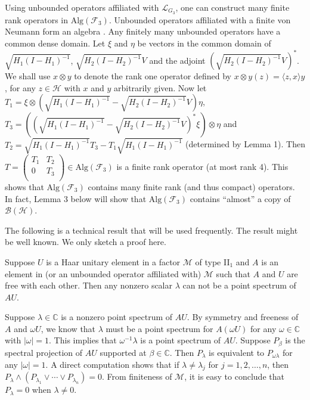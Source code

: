 \documentclass{pnastwo}
\newenvironment{proof}[1][Proof]{\begin{trivlist}
\item[\hskip \labelsep {\bfseries #1}]}{\end{trivlist}}
\newcommand{\B}{\mathcal B}
\newcommand{\F}{\mathcal F}
\newcommand{\HHH}{\mathcal H} %
\newcommand{\LLL}{\mathcal L} %
\newcommand{\M}{\mathcal M}
\newcommand{\Alg}{\mathrm{Alg}}
\newcommand{\C}{\mathbb C} %
\begin{document}
\begin{article}
Using unbounded operators affiliated with $\LLL_{G_3}$, one can
construct many finite rank operators in $\Alg(\F_3)$. Unbounded
operators affiliated with a finite von Neumann form an algebra
\cite{KR}. Any finitely many unbounded operators have a common dense domain.
Let $\xi$ and $\eta$ be vectors in the common domain of
$\sqrt{H_1(I-H_1)^{-1}}$, $\sqrt{H_2(I-H_2)^{-1}}V$ and the
adjoint $(\sqrt{H_2(I-H_2)^{-1}}V)^*$. We shall use $x\otimes y$
to denote the rank one operator defined by $x\otimes
y(z)= \langle z,x  \rangle y$, for any $z\in\HHH$ with $x$ and $y$ arbitrarily
given. Now let $T_1=\xi\otimes (\sqrt{H_1(I-H_1)^{-1}}
-\sqrt{H_2(I-H_2)^{-1}}V)\eta$, $T_3=((\sqrt{H_1(I-H_1)^{-1}}
-\sqrt{H_2(I-H_2)^{-1}}V)^*\xi)\otimes\eta$ and $T_2=
\sqrt{H_1(I-H_1)^{-1}}T_3 -T_1\sqrt{H_1(I-H_1)^{-1}}$ (determined
by Lemma 1). Then $T=\left(
         \begin{array}{cc}
           T_{1} & T_{2} \\
           0 & T_{3} \\
         \end{array}
       \right)
       \in\Alg(\F_3)$ is a finite rank operator (at most rank
4). This shows that $\Alg(\F_3)$ contains many finite rank (and
thus compact) operators. In fact, Lemma 3 below will show that
$\Alg(\F_3)$ contains ``almost'' a copy of $\B(\HHH)$.

The following is a technical result that will be used frequently.
The result might be well known. We only sketch a proof here.

\begin{lemma}
 Suppose $U$ is a Haar
unitary element in a factor $\M$ of type II$_1$ and $A$ is an
element in (or an unbounded operator affiliated with) $\M$ such
that $A$ and $U$ are free with each other. Then any nonzero scalar
$\lambda$ can not be a point spectrum of $AU$.
\end{lemma}

\begin{proof}
Suppose $\lambda\in\C$ is a nonzero
point spectrum of $AU$. By symmetry and freeness of $A$ and
$\omega U$, we know that $\lambda$ must be a point spectrum for
$A(\omega U)$ for any $\omega\in\C$ with $|\omega|=1$. This
implies that $\omega^{-1}\lambda$ is a point spectrum of $AU$.
Suppose $P_\beta$ is the spectral projection of $AU$ supported at
$\beta\in\C$. Then $P_\lambda$ is equivalent to
$P_{\omega\lambda}$ for any $|\omega|=1$. A direct computation
shows that if $\lambda\neq\lambda_j$ for $j=1,2,\ldots, n$, then
$P_\lambda\wedge(P_{\lambda_1}\vee \cdots \vee P_{\lambda_n})=0$.
From finiteness of $\M$, it is easy to conclude that $P_\lambda=0$
when $\lambda\neq0$.
\end{proof}


\end{article}
\end{document}

